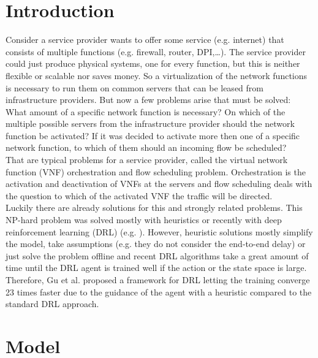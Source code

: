 \section{Introduction}%
\label{sec:introduction}
Consider a service provider wants to offer some service (e.g. internet) that consists of multiple functions (e.g. firewall, router, DPI,\dots). The service provider could just produce physical systems, one for every function, but this is neither flexible or scalable nor saves money. So a virtualization of the network functions is necessary to run them on common servers that can be leased from infrastructure providers. But now a few problems arise that must be solved: What amount of a specific network function is necessary? On which of the multiple possible servers from the infrastructure provider should the network function be activated? If it was decided to activate more then one of a specific network function, to which of them should an incoming flow be scheduled?\\
That are typical problems for a service provider, called the virtual network function (VNF) orchestration and flow scheduling problem. Orchestration is the activation and deactivation of VNFs at the servers and flow scheduling deals with the question to which of the activated VNF the traffic will be directed.  \\
Luckily there are already solutions for this and strongly related problems. This NP-hard problem was solved mostly with heuristics
or recently with deep reinforcement learning (DRL) (e.g. \cite{Guz}). However, heuristic solutions mostly simplify the model, take assumptions (e.g. they do not consider the end-to-end delay) or just solve the problem offline and recent DRL algorithms take a great amount of time until the DRL agent is trained well if the action or the state space is large. Therefore, Gu et al. \cite{Gu} proposed a framework for DRL letting the training converge 23 times faster due to the guidance of the agent with a heuristic compared to the standard DRL approach.



\section{Model} %
\label{sec:model}

